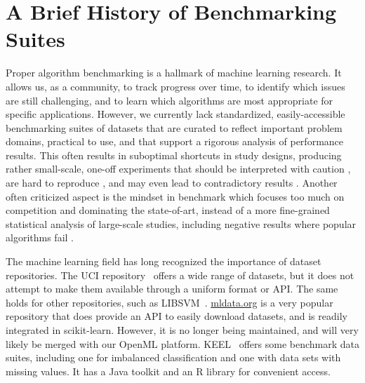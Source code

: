\documentclass[twoside,11pt]{article}
\begin{document}



\section{A Brief History of Benchmarking Suites}
\label{sec:intro}


Proper algorithm benchmarking is a hallmark of machine learning research. It allows us, as a community, to track progress over time, to identify which issues are still challenging, and to learn which algorithms are most appropriate for specific applications. However, we currently lack standardized, easily-accessible benchmarking suites of datasets that are curated to reflect important problem domains, practical to use, and that support a rigorous analysis of performance results.
This often results in suboptimal shortcuts in study designs, producing rather small-scale, one-off experiments that should be interpreted with caution \citep{Aha:1992p455}, are hard to reproduce \citep{Pedersen:2008p12980,Hirsh:2008p14360}, and may even lead to contradictory results \citep{Keogh:2003p4930}. Another often criticized aspect is the mindset in benchmark which focuses too much on competition and dominating the state-of-art, instead of a more fine-grained statistical analysis of large-scale studies, including negative results where popular algorithms fail \citep{sculley2018winner}.

The machine learning field has long recognized the importance of dataset repositories. The UCI repository~\citep{Lichman:2013} offers a wide range of datasets, but it does not attempt to make them available through a uniform format or API. The same holds for other repositories, such as LIBSVM~\citep{chang2011libsvm}. \url{mldata.org} is a very popular repository that does provide an API to easily download datasets, and is readily integrated in scikit-learn. However, it is no longer being maintained, and will very likely be merged with our OpenML platform. %
KEEL~\citep{KEEL} offers some benchmark data suites, including one for imbalanced classification and one with data sets with missing values. It has a Java toolkit and an R library for convenient access. 
\end{document}
